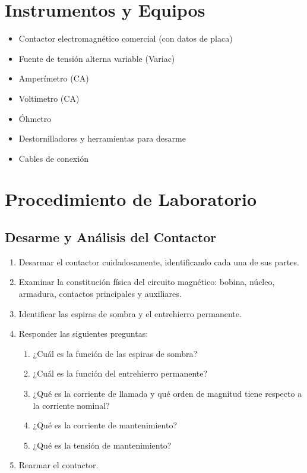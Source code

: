 \section{Instrumentos y Equipos}
\begin{itemize}
    \item Contactor electromagnético comercial (con datos de placa)
    \item Fuente de tensión alterna variable (Variac)
    \item Amperímetro (CA)
    \item Voltímetro (CA)
    \item Óhmetro
    \item Destornilladores y herramientas para desarme
    \item Cables de conexión
\end{itemize}

\section{Procedimiento de Laboratorio}

\subsection{Desarme y Análisis del Contactor}
\begin{enumerate}
    \item Desarmar el contactor cuidadosamente, identificando cada una de sus partes.
    \item Examinar la constitución física del circuito magnético: bobina, núcleo, armadura, contactos principales y auxiliares.
    \item Identificar las espiras de sombra y el entrehierro permanente.
    \item Responder las siguientes preguntas:
          \begin{enumerate}
              \item ¿Cuál es la función de las espiras de sombra?
              \item ¿Cuál es la función del entrehierro permanente?
              \item ¿Qué es la corriente de llamada y qué orden de magnitud tiene respecto a la corriente nominal?
              \item ¿Qué es la corriente de mantenimiento?
              \item ¿Qué es la tensión de mantenimiento?
          \end{enumerate}
    \item Rearmar el contactor.
\end{enumerate}

